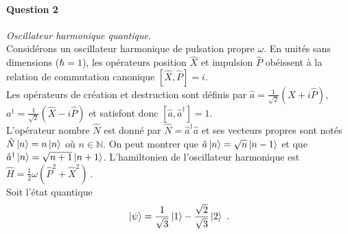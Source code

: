 \newpage

\paragraph{Question 2} \textit{Oscillateur harmonique quantique.} \\

Considérons un oscillateur harmonique de pulsation propre $\omega$. En unités sans dimensions ($\hbar=1$), les opérateurs position $\hat X$ et impulsion $\hat P$ obéissent à la relation de commutation canonique $[\hat X, \hat P]=i $. \\

Les opérateurs de création et destruction sont définis par 
$\hat a= \frac{1}{\sqrt{2}}(\hat X+i\hat P)$, $a^\dagger= \frac{1}{\sqrt{2}}(\hat X-i\hat P)$ et satisfont donc $[\hat a,\hat a^\dagger]=1$. \\

L'opérateur nombre $\hat N$ est donné par $\hat N= \hat a^\dagger \hat a$ et ses vecteurs propres sont notés $\hat N \ket{n} =n \ket{n}$ où $n \in \mathbb{N}$. On peut montrer que $\hat a \ket{n} =\sqrt{n} \ket{n-1}$ et que $\hat a^\dagger \ket{n} =\sqrt{n+1} \ket{n+1}$. L'hamiltonien de l'oscillateur harmonique est $\hat H = \frac{1}{2}\omega ( \hat P^2 + \hat X^2 )\ $. \\

Soit l'état quantique 
\begin{equation}
\vert \psi \rangle = 
 \frac{1}{\sqrt{3}}\ket{1} -  \frac{\sqrt{2}}{\sqrt{3}}\ket{2}   \ .
 \label{Eq:psi}
\end{equation}

